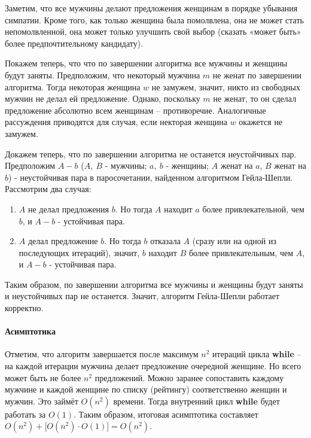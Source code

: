 \documentclass[a4paper,12pt]{article}
\begin{document}
Заметим, что все мужчины делают предложения женщинам в порядке убывания симпатии. Кроме того, как только женщина была помолвлена, она не может стать непомолвленной, она может только улучшить свой выбор (сказать «может быть» более предпочтительному кандидату).

Покажем теперь, что что по завершении алгоритма все мужчины и женщины будут заняты. Предположим, что некоторый мужчина $m$ не женат по завершении алгоритма. Тогда некоторая женщина $w$ не замужем, значит, никто из свободных мужчин не делал ей предложение. Однако, поскольку $m$ не женат, то он сделал предложение абсолютно всем женщинам -- противоречие. Аналогичные рассуждения приводятся для случая, если некторая женщина $w$ окажется не замужем.

Докажем теперь, что по завершении алгоритма не останется неустойчивых пар. Предположим $A-b$ ($A,\ B$ - мужчины; $a,\ b$ - женщины; $A$ женат на $a$, $B$ женат на $b$) - неустойчивая пара в паросочетании, найденном алгоритмом Гейла-Шепли. Рассмотрим два случая:
\begin{enumerate}
    \item $A$ не делал предложения $b$. Но тогда  $A$ находит $a$ более привлекательной, чем $b$, и $A-b$ - устойчивая пара.
    \item $A$ делал предложение $b$. Но тогда $b$ отказала $A$ (сразу или на одной из последующих итераций), значит, $b$ находит $B$ более привлекательным, чем $A$, и $A-b$ - устойчивая пара.
\end{enumerate}

Таким образом, по завершении алгоритма все мужчины и женщины будут заняты и неустойчивых пар не останется. Значит, алгоритм Гейла-Шепли работает корректно.

\paragraph{Асимптотика}

Отметим, что алгоритм завершается после максимум $n^2$ итераций цикла \textbf{while} -- на каждой итерации мужчина делает предложение очередной женщине. Но всего может быть не более $n^2$ предложений. Можно заранее сопоставить каждому мужчине и каждой женщине по списку (рейтингу) соответственно женщин и мужчин. Это займёт $O(n^2)$ времени. Тогда внутренний цикл \textbf{while} будет работать за $O(1)$. Таким образом, итоговая асимптотика составляет $O(n^2) + \big[O(n^2) \cdot O(1)\big] = O(n^2)$.

\newpage
\end{document}
